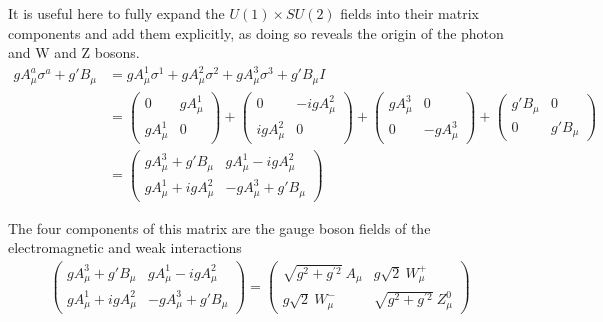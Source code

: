         It is useful here to fully expand the $U(1) \times SU(2)$ fields into their matrix components and add them explicitly,
            as doing so reveals the origin of the photon and W and Z bosons.
        \begin{equation} \begin{split}
            g A^a_{\mu} \sigma^a + g' B_{\mu} & =
                g A^1_{\mu} \sigma^1
                + g A^2_{\mu} \sigma^2
                + g A^3_{\mu} \sigma^3
                + g' B_{\mu} I \\
            & = \begin{pmatrix}
                0 & gA^1_{\mu} \\ gA^1_{\mu} & 0 \end{pmatrix}
                + \begin{pmatrix} 0 & -igA^2_{\mu} \\ igA^2_{\mu} & 0 \end{pmatrix}
                + \begin{pmatrix} gA^3_{\mu} & 0 \\ 0 & -gA^3_{\mu} \end{pmatrix}
                + \begin{pmatrix} g'B_{\mu} & 0 \\ 0 & g'B_{\mu}
            \end{pmatrix} \\
            & = \begin{pmatrix} 
                gA^3_{\mu} + g'B_{\mu} & gA^1_{\mu} - igA^2_{\mu} \\
                gA^1_{\mu} + igA^2_{\mu} & -gA^3_{\mu} + g'B_{\mu}
            \end{pmatrix}
        \end{split} \end{equation}

        The four components of this matrix are the gauge boson fields of the electromagnetic and weak interactions
        \begin{equation} \begin{split}
            \begin{pmatrix} 
                gA^3_{\mu} + g'B_{\mu} & gA^1_{\mu} - igA^2_{\mu} \\
                gA^1_{\mu} + igA^2_{\mu} & -gA^3_{\mu} + g'B_{\mu}
            \end{pmatrix} =
            \begin{pmatrix} 
                \sqrt{g^2 + g^{\prime 2}}\ A_{\mu} & g \sqrt{2}\ W^+_{\mu} \\
                g \sqrt{2}\ W^-_{\mu} & \sqrt{g^2 + g^{\prime 2}}\ Z^0_{\mu}
            \end{pmatrix}
        \end{split} \end{equation}

